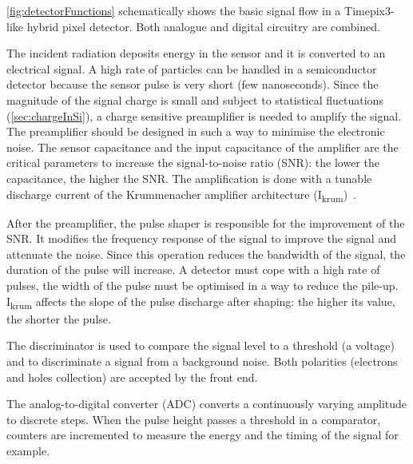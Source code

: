 \cref{fig:detectorFunctions} schematically shows the basic signal flow
in a Timepix3-like hybrid pixel detector. Both analogue and
digital circuitry are combined. 

The incident radiation deposits energy in the sensor and it is
converted to an electrical signal. A high rate of particles can be
handled in a semiconductor detector because the sensor pulse is very
short (few nanoseconds). Since the magnitude of the signal charge is
small and subject to statistical fluctuations (\cref{sec:chargeInSi}),
a charge sensitive preamplifier is needed to amplify the signal. The
preamplifier should be designed in such a way to minimise the
electronic noise. The sensor capacitance and the input capacitance of
the amplifier are the critical parameters to increase the
signal-to-noise ratio (SNR): the lower the capacitance, the higher the
SNR. The amplification is done with a tunable discharge current of the
Krummenacher amplifier architecture
(I\textsubscript{krum})~\cite{KRUMMENACHER1991527}.

After the preamplifier, the pulse shaper is responsible for the
improvement of the SNR. It modifies the frequency response of the
signal to improve the signal and attenuate the noise. Since this
operation reduces the bandwidth of the signal, the duration of the
pulse will increase. A detector must cope with a high rate of pulses,
the width of the pulse must be optimised in a way to reduce the
pile-up. I\textsubscript{krum} affects the slope of the pulse
discharge after shaping: the higher its value, the shorter the
pulse.

The discriminator is used to compare the signal level to a
threshold (a voltage) and to discriminate a signal from a background
noise. Both polarities (electrons and holes collection) are accepted
by the front end.

The analog-to-digital converter (ADC) converts a continuously varying
amplitude to discrete steps. When the pulse height passes a threshold
in a comparator, counters are incremented to measure the energy and
the timing of the signal for example.

